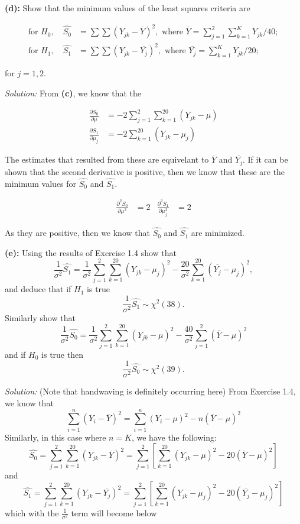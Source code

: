 \documentclass[]{article}
\begin{document}
\textbf{(d):} Show that the minimum values of the least squares criteria
are

\begin{align*}
\text{for } H_0, \quad \hat{S_0} &=  \sum \sum (Y_{jk} - \overline{Y})^2, \text{ where } \overline{Y} = \sum_{j=1}^2\sum_{k=1}^K Y_{jk}/40;\\
\text{for } H_1, \quad \hat{S_1} &= \sum \sum (Y_{jk} - \overline{Y_j})^2, \text{ where } \overline{Y_j} = \sum_{k=1}^K Y_{jk}/20;
\end{align*}

for \(j = 1,2\).

\emph{Solution: }From \textbf{(c)}, we know that the

\begin{align*}
\frac{\partial S_0}{\partial \mu} & = -2\sum_{j=1}^2\sum_{k=1}^{20}(Y_{jk} - \mu)\\
\frac{\partial S_1}{\partial \mu_j} &= -2\sum_{k=1}^{20}(Y_{jk} - \mu_j)
\end{align*}

The estimates that resulted from these are equivelant to
\(\overline{Y}\) and \(\overline{Y_j}\). If it can be shown that the
second derivative is positive, then we know that these are the minimum
values for \(\hat{S_0}\) and \(\hat{S_1}\).

\begin{align*}
\frac{\partial^2 S_0}{\partial \mu^2} &= 2 & 
\frac{\partial^2 S_1}{\partial \mu_j^2} &= 2
\end{align*}

As they are positive, then we know that \(\hat{S_0}\) and \(\hat{S_1}\)
are minimized.

\textbf{(e):} Using the results of Exercise 1.4 show that \[
\frac{1}{\sigma^2}\hat{S_1} = \frac{1}{\sigma^2}\sum_{j=1}^2\sum_{k=1}^{20}(Y_{jk} - \mu_j)^2 - \frac{20}{\sigma^2}\sum^{20}_{k=1}(\overline{Y_j} - \mu_j)^2,
\] and deduce that if \(H_1\) is true \[
\frac{1}{\sigma^2}\hat{S_1} \sim \chi^2(38).
\] Similarly show that \[
\frac{1}{\sigma^2}\hat{S_0} = \frac{1}{\sigma^2}\sum_{j=1}^2\sum_{k=1}^{20}(Y_{jk} - \mu)^2 - \frac{40}{\sigma^2}\sum_{j=1}^2(\overline{Y} - \mu)^2
\] and if \(H_0\) is true then \[
\frac{1}{\sigma^2}\hat{S_0} \sim \chi^2(39).
\]

\emph{Solution: } (Note that handwaving is definitely occurring here)
From Exercise 1.4, we know that \[
\sum_{i=1}^n(Y_i - \overline{Y})^2 = \sum_{i=1}^n(Y_i - \mu)^2 - n(\overline{Y} - \mu)^2
\] Similarly, in this case where \(n = K\), we have the following: \[
\hat{S_0} = \sum_{j=1}^2\sum_{k=1}^{20}(Y_{jk} - \overline{Y})^2 = \sum_{j=1}^2\left[\sum_{k=1}^{20}(Y_{jk} - \mu)^2 - 20(\overline{Y} - \mu)^2\right]
\] and \[
\hat{S_1} = \sum_{j=1}^2\sum_{k=1}^{20}(Y_{jk} - \overline{Y_j})^2 = \sum_{j=1}^2\left[\sum_{k=1}^{20}(Y_{jk} - \mu_j)^2 - 20(\overline{Y_j} - \mu_j)^2\right]
\] which with the \(\frac{1}{\sigma^2}\) term will become below
\end{document}
